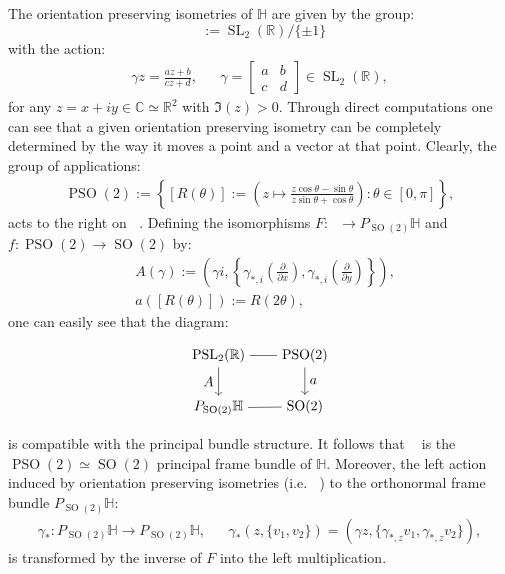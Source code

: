 \documentclass[12pt]{amsart}
\theoremstyle{definition}
\def\RR{{\mathbb R}}
\def\CC{{\mathbb C}}
\def\HH{{\mathbb{H}}}
\def\g{{\gamma}}
\DeclareMathOperator{\psl}{PSL_2(\mathbb{R})}
\newcommand{\slinear}{\operatorname{SL}}
\newcommand{\so}{\operatorname{SO}}
\newcommand{\pso}{\operatorname{PSO}}
\begin{document}
The orientation preserving isometries of $\HH$ are given by the group: \[
\psl := \slinear_2(\RR) / \{\pm 1 \}
\] 
with the action:
\begin{align*}
\g z = \frac{az+b}{cz+d}, && \g= \begin{bmatrix} a & b \\
                                                                                  c & d   \end{bmatrix} \in \slinear_2(\RR),
\end{align*}
for any $z = x+iy\in \CC \simeq \RR^2$ with $\Im (z) >0$. Through direct computations one can see that a given orientation preserving isometry can be completely determined by the way it moves a point and a vector at that point. Clearly, the group of applications:
\begin{align*}
\pso(2):=\left\lbrace [R(\theta)]:= \left( z  \mapsto \frac{z\cos \theta - \sin \theta}{z\sin \theta + \cos \theta} \right) : \theta \in [0, \pi] \right\rbrace,
\end{align*}
acts to the right on $\psl$. Defining the isomorphisms $F:\psl \longrightarrow P_{\so(2)}\HH$ and $f:\pso(2) \longrightarrow \so(2)$ by:
\begin{align*}
&A(\g)
:=
\left( \g i, \left\{ \g_{*,i} \left( \frac{\partial}{\partial x} \right) ,\g_{*,i} \left( \frac{\partial}{\partial y} \right) \right\} \right), \\
&a([R(\theta)])
:=
R(2\theta),
\end{align*}
one can easily see that the diagram:
\begin{equation*}
\begin{tikzpicture}[baseline=(current  bounding  box.center)]
  \matrix (m) [matrix of math nodes,row sep=2em,column sep=2em,minimum width=2em]
  {
      \psl & \pso(2) \\
      P_{\so(2)}\HH & \so(2) \\
  };
  \path
    (m-1-1) edge node [ above] {} (m-1-2)
    (m-2-1)	edge node [below] {} (m-2-2);
    
    
  \path[->] 
  	(m-1-1) edge node [left] {$A$} (m-2-1)
  	(m-1-2)	edge node [right] {$a$} (m-2-2);
\end{tikzpicture}
\end{equation*}
is compatible with the principal bundle structure. It follows that $\psl$ is the $\pso(2)\simeq\so(2)$ principal frame bundle of $\HH$. Moreover, the left action induced by orientation preserving isometries (i.e. $\psl$) to the orthonormal frame bundle $P_{\so(2)}\HH$:
\begin{align*}
\g_*:P_{\so (2)}\HH\longrightarrow P_{\so (2)}\HH, && 
\g_*\left(z, \{ v_1, v_2 \} \right) = \left( \g z, \{ \g_{*,z}v_1, \g_{*,z}v_2 \} \right),
\end{align*}
is transformed by the inverse of $F$ into the left multiplication.
\end{document}
